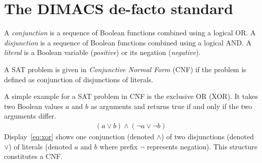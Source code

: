 

\section{The DIMACS de-facto standard}
\label{sec:sat-dimacs}
%
\begin{defi}
  A \emph{conjunction} is a sequence of Boolean functions combined using
  a logical OR. A \emph{disjunction} is a sequence of Boolean functions
  combined using a logical AND. A \emph{literal} is a Boolean variable
  (\emph{positive}) or its negation (\emph{negative}).

  A SAT problem is given in \emph{Conjunctive Normal Form} (CNF) if
  the problem is defined as conjunction of disjunctions of literals.
\end{defi}

A simple example for a SAT problem in CNF is the exclusive OR (XOR).
It takes two Boolean values $a$ and $b$ as arguments and returns true
if and only if the two arguments differ.
{
\setlength{\abovedisplayskip}{5pt}
\setlength{\belowdisplayskip}{5pt}
\setlength{\abovedisplayshortskip}{0pt}
\setlength{\belowdisplayshortskip}{0pt}
\begin{align} (a \lor b) \land (\neg a \lor \neg b) \label{eq:xor}\end{align}
}
Display~\ref{eq:xor} shows one conjunction (denoted $\land$) of two disjunctions
(denoted $\lor$) of literals (denoted $a$ and $b$ where prefix $\neg$ represents
negation). This structure constitutes a CNF.

